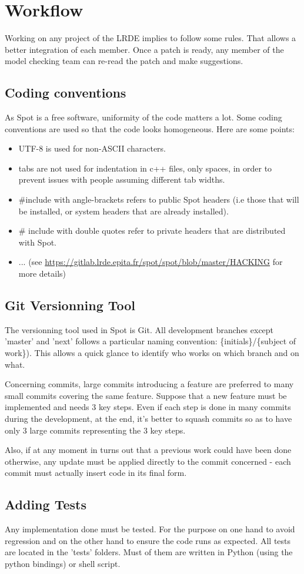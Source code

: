\section{Workflow}
Working on any project of the LRDE implies to follow some rules. That allows a better integration of each
member. Once a patch is ready, any member of the model checking team can re-read the patch and make
suggestions.

\subsection{Coding conventions}
As Spot is a free software, uniformity of the code matters a lot. Some coding conventions are used so that
the code looks homogeneous. Here are some points:
\begin{itemize}
 \item UTF-8 is used for non-ASCII characters.
 \item tabs are not used for indentation in c++ files, only spaces, in order to prevent issues with people
 assuming different tab widths.
 \item \#include with angle-brackets refers to public Spot headers (i.e those that will be installed, or
 system headers that are already installed).
 \item \# include with double quotes refer to private headers that are distributed with Spot.
 \item ... (see \url{https://gitlab.lrde.epita.fr/spot/spot/blob/master/HACKING} for more details)
\end{itemize}

\subsection{Git Versionning Tool}
The versionning tool used in Spot is Git. All development branches except 'master' and 'next' follows a particular naming convention:
\{initials\}/\{subject of work\}). This allows a quick glance to identify who works on which branch and on
what.

Concerning commits, large commits introducing a feature are preferred to many small commits covering
the same feature. Suppose that a new feature must be implemented and needs 3 key steps. Even if each step
is done in many commits during the development, at the end, it's better to squash commits so as to have
only 3 large commits representing the 3 key steps.

Also, if at any moment in turns out that a previous work
could have been done otherwise, any update must be applied directly to the commit concerned - each commit
must actually insert code in its final form.

\subsection{Adding Tests}
Any implementation done must be tested. For the purpose on one hand to avoid regression and on the other
hand to ensure the code runs as expected. All tests are located in the 'tests' folders. Must of them
are written in Python (using the python bindings) or shell script.

